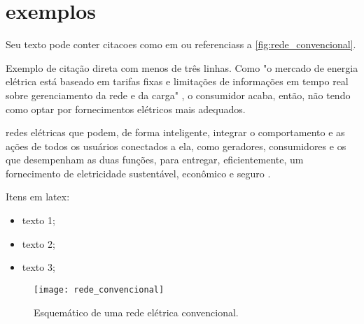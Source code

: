 \chapter[Exemplos]{exemplos}
\label{ch:exemplos}

Seu texto pode conter citacoes como em \cite{Legislativa} ou referenciass a \autoref{fig:rede_convencional}.

Exemplo de citação direta com menos de três linhas. Como "o mercado de energia elétrica está baseado em tarifas fixas e limitações de informações em tempo real sobre gerenciamento da rede e da carga" \cite[p. 15]{cgee}, o consumidor acaba, então, não tendo como optar por fornecimentos elétricos mais adequados.

\begin{citacao}[brazil]
[...] redes elétricas que podem, de forma inteligente, integrar o comportamento e as ações de todos os usuários conectados a ela, como geradores, consumidores e os que desempenham as duas funções, para entregar, eficientemente, um fornecimento de eletricidade sustentável, econômico e seguro \cite[p. 51, tradução livre]{yu2011new}.
\end{citacao}

\lipsum[1-1]

Itens em latex:
\begin{itemize}
	\item texto 1;
	\item texto 2;
	\item texto 3;
\end{itemize}

\begin{figure}[h!]
	\texttt{[image: rede\_convencional]}
	\centering
	\caption[Esquemático de uma rede elétrica convencional.]{Esquemático de uma rede elétrica convencional.}
	\label{fig:rede_convencional}
\end{figure}
\FloatBarrier

